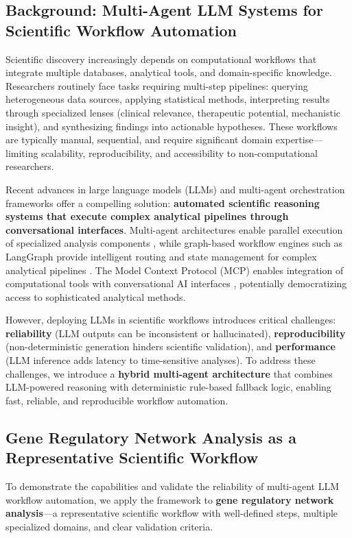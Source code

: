 \documentclass[11pt]{article}
\begin{document}
\subsection{Background: Multi-Agent LLM Systems for Scientific Workflow Automation}

Scientific discovery increasingly depends on computational workflows that integrate multiple databases, analytical tools, and domain-specific knowledge. Researchers routinely face tasks requiring multi-step pipelines: querying heterogeneous data sources, applying statistical methods, interpreting results through specialized lenses (clinical relevance, therapeutic potential, mechanistic insight), and synthesizing findings into actionable hypotheses. These workflows are typically manual, sequential, and require significant domain expertise---limiting scalability, reproducibility, and accessibility to non-computational researchers.

Recent advances in large language models (LLMs) and multi-agent orchestration frameworks offer a compelling solution: \textbf{automated scientific reasoning systems that execute complex analytical pipelines through conversational interfaces}. Multi-agent architectures enable parallel execution of specialized analysis components \cite{wooldridge2009}, while graph-based workflow engines such as LangGraph provide intelligent routing and state management for complex analytical pipelines \cite{langgraph}. The Model Context Protocol (MCP) enables integration of computational tools with conversational AI interfaces \cite{anthropic_mcp}, potentially democratizing access to sophisticated analytical methods.

However, deploying LLMs in scientific workflows introduces critical challenges: \textbf{reliability} (LLM outputs can be inconsistent or hallucinated), \textbf{reproducibility} (non-deterministic generation hinders scientific validation), and \textbf{performance} (LLM inference adds latency to time-sensitive analyses). To address these challenges, we introduce a \textbf{hybrid multi-agent architecture} that combines LLM-powered reasoning with deterministic rule-based fallback logic, enabling fast, reliable, and reproducible workflow automation.

\subsection{Gene Regulatory Network Analysis as a Representative Scientific Workflow}

To demonstrate the capabilities and validate the reliability of multi-agent LLM workflow automation, we apply the framework to \textbf{gene regulatory network analysis}---a representative scientific workflow with well-defined steps, multiple specialized domains, and clear validation criteria.
\end{document}
